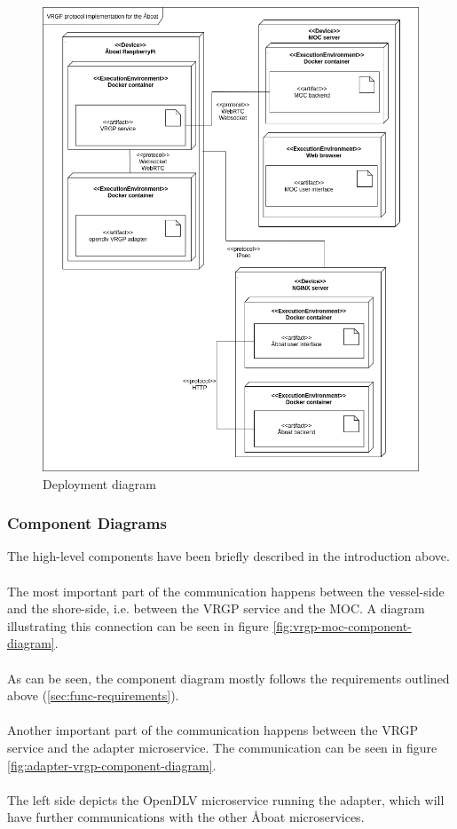 \begin{figure}[ht]
	\centering
	\includegraphics[width=\linewidth]{diagrams/deployment-diagram}
	\caption{Deployment diagram}
	\label{fig:deployment-diagram}
\end{figure}

\subsubsection{Component Diagrams}

The high-level components have been briefly described in the introduction above.
\\\\
The most important part of the communication happens between the vessel-side and the shore-side, i.e. between the VRGP service and the MOC. A diagram illustrating this connection can be seen in figure \ref{fig:vrgp-moc-component-diagram}.
\\\\
As can be seen, the component diagram mostly follows the requirements outlined above (\ref{sec:func-requirements}).
\\\\
Another important part of the communication happens between the VRGP service and the adapter microservice. The communication can be seen in figure \ref{fig:adapter-vrgp-component-diagram}.
\\\\
The left side depicts the OpenDLV microservice running the adapter, which will have further communications with the other Åboat microservices.

